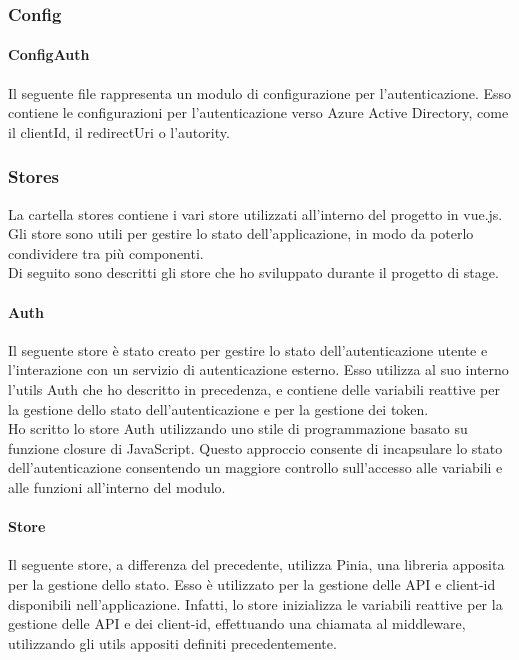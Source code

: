 \subsubsection{Config}\label{subsubsec:config}
\paragraph{ConfigAuth}\label{par:config-auth}
Il seguente file rappresenta un modulo di configurazione per l'autenticazione. Esso contiene le configurazioni per l'autenticazione verso Azure Active Directory,
come il clientId, il redirectUri o l'autority.  

\subsubsection{Stores}\label{subsubsec:store}
La cartella stores contiene i vari store utilizzati all'interno del progetto in vue.js. Gli store sono utili per gestire lo stato dell'applicazione,
in modo da poterlo condividere tra più componenti.\\
Di seguito sono descritti gli store che ho sviluppato durante il progetto di stage.

\paragraph{Auth}\label{par:auth-store}
Il seguente store è stato creato per gestire lo stato dell'autenticazione utente e l'interazione con un servizio di autenticazione esterno.
Esso utilizza al suo interno l'utils Auth che ho descritto in precedenza, e contiene delle variabili reattive per la gestione dello stato dell'autenticazione
e per la gestione dei token.\\
Ho scritto lo store Auth utilizzando uno stile di programmazione basato su funzione closure di JavaScript. Questo approccio consente di incapsulare
lo stato dell'autenticazione consentendo un maggiore controllo sull'accesso alle variabili e alle funzioni all'interno del modulo.

\paragraph{Store}\label{par:store}
Il seguente store, a differenza del precedente, utilizza Pinia, una libreria apposita per la gestione dello stato.
Esso è utilizzato per la gestione delle API e client-id disponibili nell'applicazione. Infatti, lo store inizializza le variabili reattive per la gestione
delle API e dei client-id, effettuando una chiamata al middleware, utilizzando gli utils appositi definiti precedentemente.

